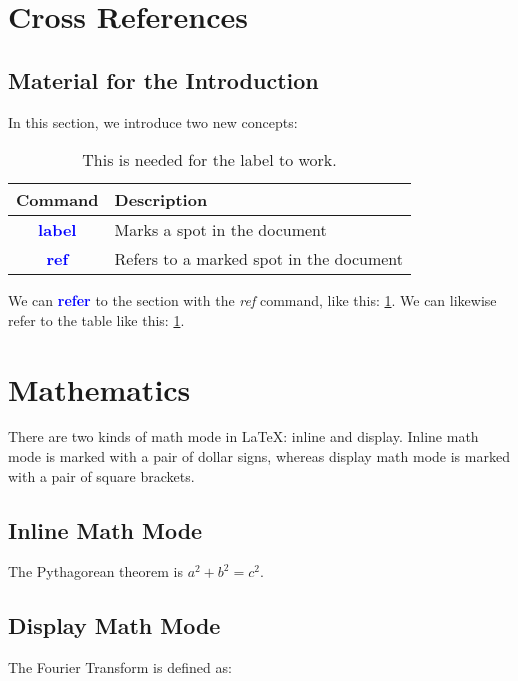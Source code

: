 \documentclass{article}
\newcommand{\kw}[1]{\textcolor{blue}{\textbf{#1}}}
\newcommand{\cmd}[1]{\textit{#1}}
\begin{document}
\section{Cross References}
\label{sec:cross-references}

\subsection{Material for the Introduction}

In this section, we introduce two new concepts:

\begin{table}[ht] %
  \begin{tabular}{cp{9cm}}
     Command & Description \\
     \toprule
     \kw{label} & Marks a spot in the document \\
     \kw{ref} & Refers to a marked spot in the document \\
     \bottomrule
  \end{tabular}
  \caption{This is needed for the label to work.}
  \label{tab:cross-reference-commands} %
\end{table}

We can \kw{refer} to the section with the \cmd{ref} command, like this: \ref{sec:cross-references}.
We can likewise refer to the table like this: \ref{tab:cross-reference-commands}.

\section{Mathematics}

There are two kinds of math mode in LaTeX: inline and display. Inline math mode is marked with
a pair of dollar signs, whereas display math mode is marked with a pair of square brackets.

\subsection{Inline Math Mode}

The Pythagorean theorem is $a^2 + b^2 = c^2$.

\subsection{Display Math Mode}

The Fourier Transform is defined as:
\end{document}
